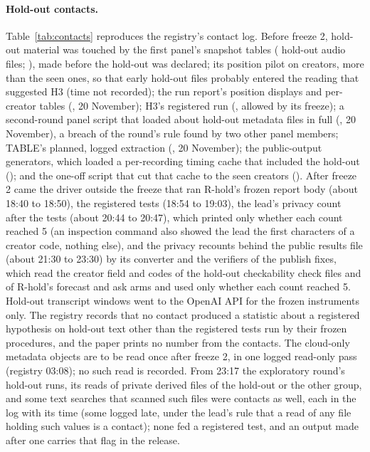 \paragraph{Hold-out contacts.} Table~\ref{tab:contacts} reproduces the registry's contact log. Before freeze 2, hold-out
material was touched by the first panel's snapshot tables (\ContactSnapshotFiles{} hold-out audio files;
\ContactSnapshotStamp), made before the hold-out was declared; its position pilot on \PilotCreators{} creators, more than
the seen ones, so that early hold-out files probably entered the reading that suggested H3 (time not recorded); the run
report's position displays and per-creator tables (\ContactRunReportStamp, 20 November); H3's registered run
(\HThreeRunStamp, allowed by its freeze); a second-round panel script that loaded about \ContactCoverageFiles{}
hold-out metadata files in full (\ContactCoverageStamp, 20 November), a breach of the round's rule found by two other
panel members; TABLE's planned, logged extraction (\ContactTableStamp, 20 November); the public-output generators, which
loaded a per-recording timing cache that included the hold-out (\ContactPrivacyStamp); and the one-off script that cut
that cache to the seen creators (\ContactSeenDerivStamp). After freeze 2 came the driver outside the freeze that ran
R-hold's frozen report body (about 18:40 to 18:50), the registered tests (18:54 to 19:03), the lead's privacy count
after the tests (about 20:44 to 20:47), which printed only whether each count reached 5 (an inspection command also
showed the lead the first characters of a creator code, nothing else), and the privacy recounts behind the public
results file (about 21:30 to 23:30) by its converter and the verifiers of the publish fixes, which read the creator
field and codes of the hold-out checkability check files and of R-hold's forecast and ask arms and used only whether
each count reached 5. Hold-out transcript windows went to the OpenAI
API for the frozen instruments only. The registry records that no contact produced a statistic about a registered
hypothesis on hold-out text other than the registered tests run by their frozen procedures, and the paper prints no
number from the contacts. The \NCloudOnlyObjects{} cloud-only metadata objects are to be read once after freeze 2, in
one logged read-only pass (registry 03:08); no such read is recorded. From 23:17 the exploratory round's hold-out
runs, its reads of private derived files of the hold-out or the other group, and some text searches that scanned such
files were contacts as well, each in the log with its time (some logged late, under the lead's rule that a read of any
file holding such values is a contact); none fed a registered test, and an output made after one carries that flag in
the release.

